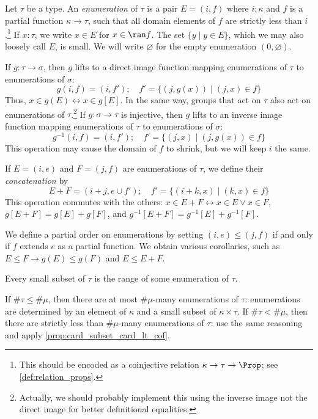\begin{definition}[enumeration]
  \label{def:Enumeration}
  \leanok
  Let \( \tau \) be a type.
  An \emph{enumeration} of \( \tau \) is a pair \( E = (i, f) \) where \( i : \kappa \) and \( f \) is a partial function \( \kappa \to \tau \), such that all domain elements of \( f \) are strictly less than \( i \).\footnote{This should be encoded as a coinjective relation \( \kappa \to \tau \to \Prop \); see \cref{def:relation_props}.}
  If \( x : \tau \), we write \( x \in E \) for \( x \in \ran f \).
  The set \( \{ y \mid y \in E \} \), which we may also loosely call \( E \), is small.
  We will write \( \varnothing \) for the empty enumeration \( (0, \varnothing) \).

  If \( g : \tau \to \sigma \), then \( g \) lifts to a direct image function mapping enumerations of \( \tau \) to enumerations of \( \sigma \):
  \[ g(i, f) = (i, f');\quad f' = \{ (j, g(x)) \mid (j, x) \in f \} \]
  Thus, \( x \in g(E) \leftrightarrow x \in g[E] \).
  In the same way, groups that act on \( \tau \) also act on enumerations of \( \tau \).\footnote{Actually, we should probably implement this using the inverse image not the direct image for better definitional equalities.}
  If \( g : \sigma \to \tau \) is injective, then \( g \) lifts to an inverse image function mapping enumerations of \( \tau \) to enumerations of \( \sigma \):
  \[ g^{-1}(i, f) = (i, f');\quad f' = \{ (j, x) \mid (j, g(x)) \in f \} \]
  This operation may cause the domain of \( f \) to shrink, but we will keep \( i \) the same.

  If \( E = (i, e) \) and \( F = (j, f) \) are enumerations of \( \tau \), we define their \emph{concatenation} by
  \[ E + F = (i + j, e \cup f');\quad f' = \{(i + k, x) \mid (k, x) \in f \} \]
  This operation commutes with the others: \( x \in E + F \leftrightarrow x \in E \vee x \in F \), \( g[E + F] = g[E] + g[F] \), and \( g^{-1}[E + F] = g^{-1}[E] + g^{-1}[F] \).

  We define a partial order on enumerations by setting \( (i, e) \leq (j, f) \) if and only if \( f \) extends \( e \) as a partial function.
  We obtain various corollaries, such as \( E \leq F \to g(E) \leq g(F) \) and \( E \leq E + F \).

  Every small subset of \( \tau \) is the range of some enumeration of \( \tau \).

  If \( \#\tau \leq \#\mu \), then there are at most \( \#\mu \)-many enumerations of \( \tau \): enumerations are determined by an element of \( \kappa \) and a small subset of \( \kappa \times \tau \).
  If \( \#\tau < \#\mu \), then there are strictly less than \( \#\mu \)-many enumerations of \( \tau \): use the same reasoning and apply \cref{prop:card_subset_card_lt_cof}.
\end{definition}
